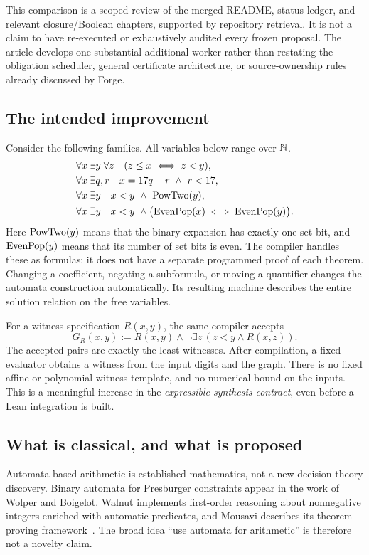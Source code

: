 This comparison is a scoped review of the merged README, status ledger, and relevant closure/Boolean chapters, supported by repository retrieval. It is not a claim to have re-executed or exhaustively audited every frozen proposal. The article develops one substantial additional worker rather than restating the obligation scheduler, general certificate architecture, or source-ownership rules already discussed by Forge.

\subsection{The intended improvement}
Consider the following families. All variables below range over \(\mathbb N\).
\begin{align}
 &\forall x\;\exists y\;\forall z\quad (z\le x\iff z<y),\label{eq:cut}\\
 &\forall x\;\exists q,r\quad x=17q+r\ \land\ r<17,\label{eq:division}\\
 &\forall x\;\exists y\quad x<y\ \land\ \Pow(y),\label{eq:pow-unbounded}\\
 &\forall x\;\exists y\quad x<y\ \land\bigl(\Even(x)\iff\Even(y)\bigr).
\end{align}
Here \(\operatorname{PowTwo}(y)\) means that the binary expansion has exactly one set bit, and \(\operatorname{EvenPop}(y)\) means that its number of set bits is even. The compiler handles these as formulas; it does not have a separate programmed proof of each theorem. Changing a coefficient, negating a subformula, or moving a quantifier changes the automata construction automatically. Its resulting machine describes the entire solution relation on the free variables.

For a witness specification \(R(x,y)\), the same compiler accepts
\[
 G_R(x,y):=R(x,y)\land\neg\exists z\,(z<y\land R(x,z)).
\]
The accepted pairs are exactly the least witnesses. After compilation, a fixed evaluator obtains a witness from the input digits and the graph. There is no fixed affine or polynomial witness template, and no numerical bound on the inputs. This is a meaningful increase in the \emph{expressible synthesis contract}, even before a Lean integration is built.

\subsection{What is classical, and what is proposed}
Automata-based arithmetic is established mathematics, not a new decision-theory discovery. Binary automata for Presburger constraints appear in the work of Wolper and Boigelot. Walnut implements first-order reasoning about nonnegative integers enriched with automatic predicates, and Mousavi describes its theorem-proving framework~\cite{wolper,mousavi,walnut}. The broad idea ``use automata for arithmetic'' is therefore not a novelty claim.

